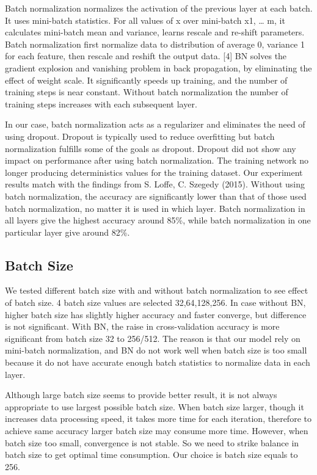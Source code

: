 \documentclass[journal,onecolumn]{IEEEtran}
\begin{document}
Batch normalization normalizes the activation of the previous layer at each batch. It uses mini-batch statistics. For all values of x over mini-batch {x1, … m}, it calculates mini-batch mean and variance, learns rescale and re-shift parameters. Batch normalization first normalize data to distribution of average 0, variance 1 for each feature, then rescale and reshift the output data. [4] BN solves the gradient explosion and vanishing problem in back propagation, by eliminating the effect of weight scale. It significantly speeds up training, and the number of training steps is near constant. Without batch normalization the number of training steps increases with each subsequent layer.

In our case, batch normalization acts as a regularizer and eliminates the need of using dropout.  Dropout is typically used to reduce overfitting but batch normalization fulfills some of the goals as dropout. Dropout did not show any impact on performance after using batch normalization. The training network no longer producing deterministics values for the training dataset. Our experiment results match with the findings from S. Loffe, C. Szegedy (2015). Without using batch normalization, the accuracy are significantly lower than that of those used batch normalization, no matter it is used in which layer. Batch normalization in all layers give the highest accuracy around 85\%, while batch normalization in one particular layer give around 82\%.

\subsection{Batch Size}
We tested different batch size with and without batch normalization to see effect of batch size. 4 batch size values are selected {32,64,128,256}. 
In case without BN, higher batch size has slightly higher accuracy and faster converge, but difference is not significant. With BN, the raise in cross-validation accuracy is more significant from batch size 32 to 256/512. The reason is that our model rely on mini-batch normalization, and BN do not work well when batch size is too small because it do not have accurate enough batch statistics to normalize data in each layer.

Although large batch size seems to provide better result, it is not always appropriate to use largest possible batch size. When batch size larger, though it increases data processing speed, it takes more time for each iteration, therefore to achieve same accuracy larger batch size may consume more time. However, when batch size too small, convergence is not stable. So we need to strike balance in batch size to get optimal time consumption. Our choice is batch size equals to 256.
\end{document}
